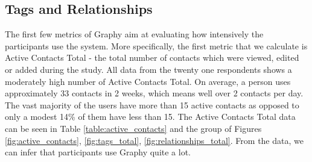 \subsection{Tags and Relationships}\label{results_tags_relationships}
The first few metrics of Graphy aim at evaluating how intensively the participants use the system. More specifically, the first metric that we calculate is Active Contacts Total - the total number of contacts which were viewed, edited or added during the study. All data from the twenty one respondents shows a moderately high number of Active Contacts Total. On average, a person uses approximately 33 contacts in 2 weeks, which means well over 2 contacts per day. The vast majority of the users have more than 15 active contacts as opposed to only a modest 14\% of them have less than 15. The Active Contacts Total data can be seen in Table \ref{table:active_contacts} and the group of Figures \ref{fig:active_contacts}, \ref{fig:tags_total}, \ref{fig:relationships_total}. From the data, we can infer that participants use Graphy quite a lot. 

